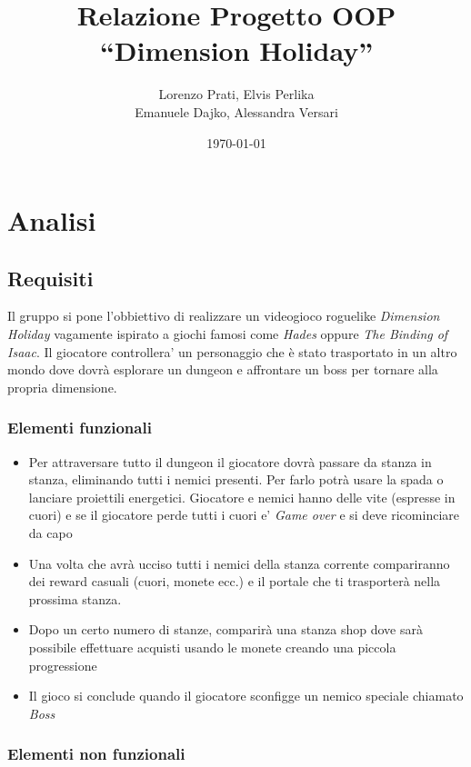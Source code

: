 \documentclass[a4paper,12pt]{report}
\title{Relazione Progetto OOP\\``Dimension Holiday''}
\author{Lorenzo Prati, Elvis Perlika\\ Emanuele Dajko, Alessandra Versari}
\date{\today}
\begin{document}
\maketitle

\tableofcontents

\chapter{Analisi}

\section{Requisiti}

Il gruppo si pone l'obbiettivo di realizzare un videogioco roguelike \textit{Dimension Holiday} vagamente ispirato a giochi famosi come \textit{Hades} oppure \textit{The Binding of Isaac}. Il giocatore controllera' un personaggio che è stato trasportato in un altro mondo dove dovrà
esplorare un dungeon e affrontare un boss per tornare alla propria
dimensione.

\subsection*{Elementi funzionali}

\begin{itemize}
	\item Per attraversare tutto il dungeon il giocatore dovrà passare da stanza in stanza,
	eliminando tutti i nemici presenti. Per farlo potrà usare la spada o lanciare
	proiettili energetici. Giocatore e nemici hanno delle vite (espresse in cuori) e se il giocatore perde tutti i cuori e' \textit{Game over} e si deve ricominciare da capo
	\item Una volta che avrà ucciso tutti i nemici della stanza corrente
	compariranno dei reward casuali (cuori, monete ecc.) e il portale che
	ti trasporterà nella prossima stanza. 
	\item Dopo un certo numero di stanze, comparirà una stanza shop
	dove sarà possibile effettuare acquisti usando le monete creando una piccola progressione
	\item Il gioco si conclude quando il giocatore sconfigge un nemico speciale chiamato \textit{Boss}
	
\end{itemize}

\subsection*{Elementi non funzionali}
\end{document}
